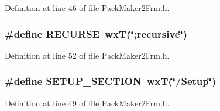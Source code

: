 Definition at line 46 of file Pack\-Maker2Frm.h.
\subsubsection{\setlength{\rightskip}{0pt plus 5cm}\#define RECURSE~wx\-T(\char`\"{};recursive\char`\"{})}\label{_pack_maker2_frm_8h_c0c299988aa45f396d7e7296bfa59851}




Definition at line 52 of file Pack\-Maker2Frm.h.
\subsubsection{\setlength{\rightskip}{0pt plus 5cm}\#define SETUP\_\-SECTION~wx\-T(\char`\"{}/Setup\char`\"{})}\label{_pack_maker2_frm_8h_2fbb5362780131f31dbb086eb5e3cded}




Definition at line 49 of file Pack\-Maker2Frm.h.